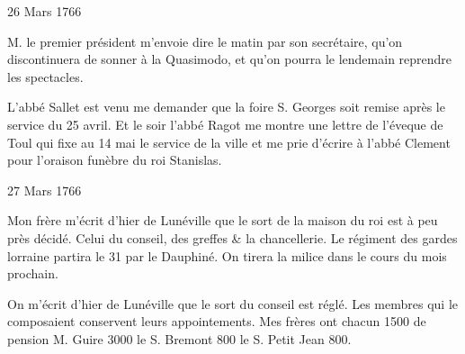                      \begin{diary}{26 Mars 1766}{}
                        
                        
                           M. le premier président m'envoie dire le
                           matin par son secrétaire, qu'on discontinuera
                           de sonner à la Quasimodo, et qu'on pourra
                           le lendemain reprendre les spectacles. \bigskip
        
        
                        
                           L'abbé Sallet est venu me demander
                           que
                           la foire S. Georges soit remise après le
                           service
                           du 25 avril. Et le soir l'abbé Ragot
                           me montre une lettre de
                              l'éveque de Toul
                           qui fixe au 14 mai le service de la
                           ville
                           et me prie d'écrire à l'abbé
                              Clement
                           pour l'oraison funèbre du roi Stanislas.
                        \bigskip
        
        
                     \end{diary}

                     \begin{diary}{27 Mars 1766}{}
                        
                        
                           Mon frère m'écrit d'hier de Lunéville que
                           le sort de la maison du roi
                           est à peu près
                           décidé. Celui du conseil, des
                           greffes &
                           la chancellerie. Le régiment des gardes lorraine
                           partira le 31 par le Dauphiné. On tirera
                           la milice dans le cours
                           du mois prochain. \bigskip
        
        
                        
                         On m'écrit d'hier de Lunéville que le sort
                           du conseil est réglé. Les membres
                           qui
                           le composaient conservent leurs appointements.
                           Mes frères
                           ont chacun 1500 de
                           pension M. Guire
                           3000
                           le S. Bremont
                           800
                           le S. Petit Jean
                           800\up{#}. \bigskip
        
        
                     \end{diary}

